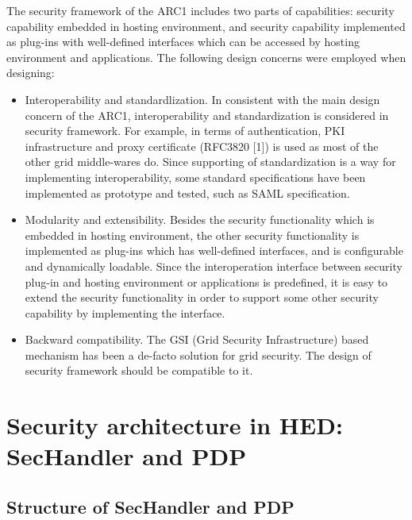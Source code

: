 \documentclass{book}
\begin{document}
The security framework of the ARC1 includes two parts of capabilities: security capability embedded in hosting environment, and security capability implemented as plug-ins with well-defined interfaces which can be accessed by hosting environment and applications. The following design concerns were employed when designing:

\begin{itemize}
    \item Interoperability and standardlization. In consistent with the main design concern of the ARC1, interoperability and standardization is considered in security framework. For example, in terms of authentication, PKI infrastructure and proxy certificate (RFC3820 [1]) is used as most of the other grid middle-wares do. Since supporting of standardization is a way for implementing interoperability, some standard specifications have been implemented as prototype and tested, such as SAML specification.

    \item Modularity and extensibility. Besides the security functionality which is embedded in hosting environment, the other security functionality is implemented as plug-ins which has well-defined interfaces, and is configurable and dynamically loadable. Since the interoperation interface between security plug-in and hosting environment or applications is predefined, it is easy to extend the security functionality in order to support some other security capability by implementing the interface.

    \item Backward compatibility. The GSI (Grid Security Infrastructure) based mechanism has been a de-facto solution for grid security. The design of security framework should be compatible to it.

\end{itemize}


\section{Security architecture in HED: SecHandler and PDP} %
\label{sec:sec_architecture}


\subsection{Structure of SecHandler and PDP} %
\label{subsec:structure_sechandler}
\end{document}
